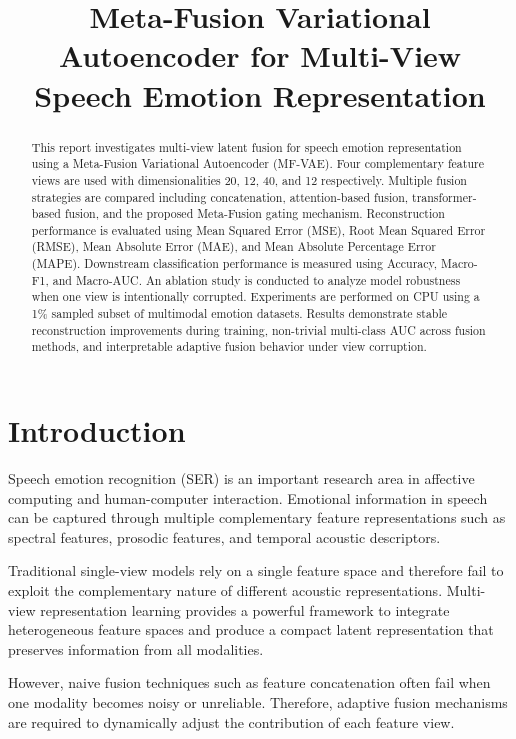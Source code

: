 \documentclass[conference]{IEEEtran}
\title{Meta-Fusion Variational Autoencoder for Multi-View Speech Emotion Representation}
\author{
\IEEEauthorblockN{Sumit Kumar}
\IEEEauthorblockA{
Department of Computer Science and Engineering\\
National Institute of Technology Hamirpur\\
Hamirpur, India}
}
\begin{document}
\maketitle

\begin{abstract}

This report investigates multi-view latent fusion for speech emotion representation using a Meta-Fusion Variational Autoencoder (MF-VAE). Four complementary feature views are used with dimensionalities 20, 12, 40, and 12 respectively. Multiple fusion strategies are compared including concatenation, attention-based fusion, transformer-based fusion, and the proposed Meta-Fusion gating mechanism. Reconstruction performance is evaluated using Mean Squared Error (MSE), Root Mean Squared Error (RMSE), Mean Absolute Error (MAE), and Mean Absolute Percentage Error (MAPE). Downstream classification performance is measured using Accuracy, Macro-F1, and Macro-AUC. An ablation study is conducted to analyze model robustness when one view is intentionally corrupted. Experiments are performed on CPU using a 1\% sampled subset of multimodal emotion datasets. Results demonstrate stable reconstruction improvements during training, non-trivial multi-class AUC across fusion methods, and interpretable adaptive fusion behavior under view corruption.
\end{abstract}

\section{Introduction}

Speech emotion recognition (SER) is an important research area in affective computing and human-computer interaction. Emotional information in speech can be captured through multiple complementary feature representations such as spectral features, prosodic features, and temporal acoustic descriptors.

Traditional single-view models rely on a single feature space and therefore fail to exploit the complementary nature of different acoustic representations. Multi-view representation learning provides a powerful framework to integrate heterogeneous feature spaces and produce a compact latent representation that preserves information from all modalities.

However, naive fusion techniques such as feature concatenation often fail when one modality becomes noisy or unreliable. Therefore, adaptive fusion mechanisms are required to dynamically adjust the contribution of each feature view.
\end{document}
